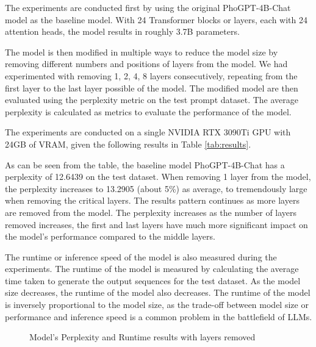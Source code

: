 The experiments are conducted first by using the original PhoGPT-4B-Chat model as the baseline model. With 24 Transformer blocks or layers, each with 24 attention heads, the model results in roughly 3.7B parameters.  \par
The model is then modified in multiple ways to reduce the model size by removing different numbers and positions of layers from the model. We had experimented with removing 1, 2, 4, 8 layers consecutively, repeating from the first layer to the last layer possible of the model. The modified model are then evaluated using the perplexity metric on the test prompt dataset. The average perplexity is calculated as metrics to evaluate the performance of the model. \par
The experiments are conducted on a single NVIDIA RTX 3090Ti GPU with 24GB of VRAM, given the following results in Table \ref{tab:results}. \par


As can be seen from the table, the baseline model PhoGPT-4B-Chat has a perplexity of 12.6439 on the test dataset. When removing 1 layer from the model, the perplexity increases to 13.2905 (about 5\%) as average, to tremendously large when removing the critical layers. The results pattern continues as more layers are removed from the model. The perplexity increases as the number of layers removed increases, the first and last layers have much more significant impact on the model's performance compared to the middle layers. \par
The runtime or inference speed of the model is also measured during the experiments. The runtime of the model is measured by calculating the average time taken to generate the output sequences for the test dataset. As the model size decreases, the runtime of the model also decreases. The runtime of the model is inversely proportional to the model size, as the trade-off between model size or performance and inference speed is a common problem in the battlefield of LLMs. \par

\begin{figure*}[!h]
    \centering
    \caption{Model's Perplexity and Runtime results with layers removed}
    \label{fig:results_plot}
\end{figure*}